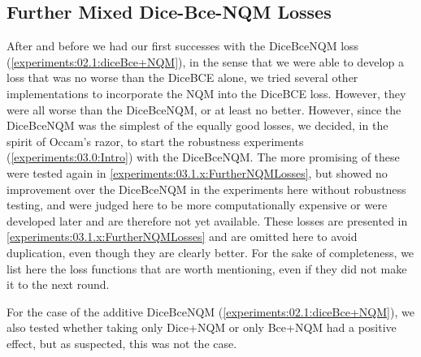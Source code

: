 \subsection{Further Mixed Dice-Bce-NQM Losses}
\label{experiments:02.2:FurtherDice-Bce-NQMLosses}
After and before we had our first successes with the DiceBceNQM loss (\autoref{experiments:02.1:diceBce+NQM}), in the sense that we were able to develop a loss that was no worse than the DiceBCE alone, we tried several other implementations to incorporate the NQM into the DiceBCE loss. However, they were all worse than the DiceBceNQM, or at least no better. However, since the DiceBceNQM was the simplest of the equally good losses, we decided, in the spirit of Occam's razor, to start the robustness experiments (\autoref{experiments:03.0:Intro}) with the DiceBceNQM. The more promising of these were tested again in \autoref{experiments:03.1.x:FurtherNQMLosses}, but showed no improvement over the DiceBceNQM in the experiments here without robustness testing, and were judged here to be more computationally expensive or were developed later and are therefore not yet available. These losses are presented in \autoref{experiments:03.1.x:FurtherNQMLosses} and are omitted here to avoid duplication, even though they are clearly better. For the sake of completeness, we list here the loss functions that are worth mentioning, even if they did not make it to the next round.

For the case of the additive DiceBceNQM (\autoref{experiments:02.1:diceBce+NQM}), we also tested whether taking only Dice+NQM or only Bce+NQM had a positive effect, but as suspected, this was not the case.


\iffalse
... hier stimmte irgendwas nicht ...
... diceBceMasks (Bce with no reduction) was used and the nqm was put in as weight, before the mean was build ... therefore the nqm was calculated pixelwise ... but did not work
\begin{align}
    \mathrm{DiceBceMaskNQM}     &= \mathrm{DiceLoss} + \mathrm{mean} (NQM_mask \cdot \mathrm{BCE})\\
    \mathrm{BCE}(x,y)           &=  -[y_n \cdot \log x_n + (1-y_n) \cdot \log (1-x_n)]\\
    \mathrm{DiceLoss}           &= 1 - \frac{2 \cdot {\sum^D(y \cdot f_\theta(x))}}
                                            {\sum^D(f_\theta(x)) + \sum^D(f_\theta(x))}
\end{align}
... diceBce SD
... Bce weighted with NQM


\fi

